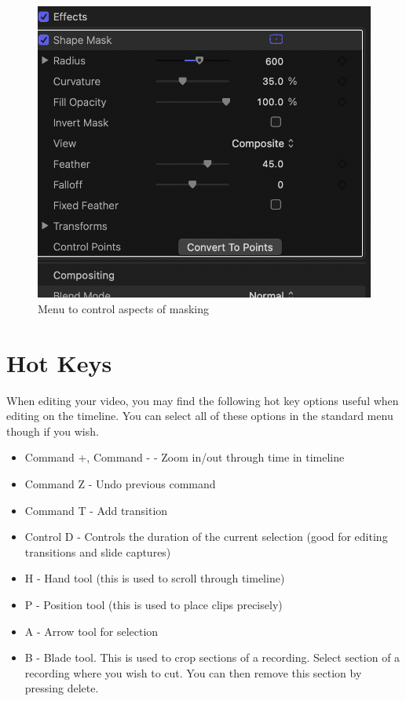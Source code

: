\documentclass[
]{book}
\begin{document}
\begin{figure}

{\centering \includegraphics[width=1\linewidth]{Emenu} 

}

\caption{Menu to control aspects of masking}\label{fig:emenu}
\end{figure}

\hypertarget{hot-keys}{%
\section{Hot Keys}\label{hot-keys}}

When editing your video, you may find the following hot key options useful when editing on the timeline. You can select all of these options in the standard menu though if you wish.

\begin{itemize}
\item
  Command +, Command - - Zoom in/out through time in timeline
\item
  Command Z - Undo previous command
\item
  Command T - Add transition
\item
  Control D - Controls the duration of the current selection (good for editing transitions and slide captures)
\item
  H - Hand tool (this is used to scroll through timeline)
\item
  P - Position tool (this is used to place clips precisely)
\item
  A - Arrow tool for selection
\item
  B - Blade tool. This is used to crop sections of a recording. Select section of a recording where you wish to cut. You can then remove this section by pressing delete.
\end{itemize}
\end{document}
